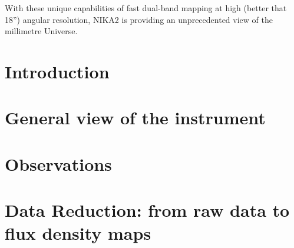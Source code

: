 \documentclass[traditionalabstract]{aa}
\begin{document}
       {With these unique capabilities of fast dual-band mapping at
         high (better that 18'') angular resolution, NIKA2 is providing an unprecedented view
         of the millimetre Universe.}      
       
   \maketitle
\section{Introduction}
\label{se:intro}



\section{General view of the instrument}
\label{se:instru}



\section{Observations}
\label{se:observations}



\section{Data Reduction: from raw data to flux density maps}
\label{se:dataproc}

\end{document}
